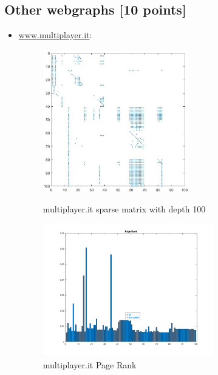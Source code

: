 \documentclass[unicode,11pt,a4paper,oneside,numbers=endperiod,openany]{scrartcl}
\begin{document}
\subsection{Other webgraphs [10 points]}
\begin{itemize}
    \item \href{http://www.multiplayer.it}{www.multiplayer.it}:
    \begin{figure}[H]
    \centering
    
    \includegraphics[width=0.6\textwidth]{multipl100.jpg}
    \caption{multiplayer.it sparse matrix with depth 100}
    
    \includegraphics[width=0.7\textwidth]{multipl100PR.jpg}
    \caption{multiplayer.it Page Rank}
    \end{figure}

\newpage


\end{itemize}
\end{document}
